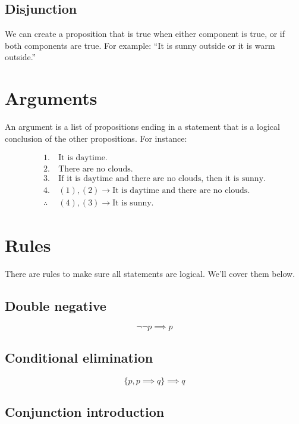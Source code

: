 \documentclass[a4paper,10pt]{report}
\begin{document}
\subsection{Disjunction}

We can create a proposition that is true when either component is true, or if
both components are true. For example: ``It is sunny outside or it is warm
outside.''

\section{Arguments}

An argument is a list of propositions ending in a statement that is a logical
conclusion of the other propositions. For instance:

\begin{align*}
 1.~&\text{It is daytime.} \\
 2.~&\text{There are no clouds.} \\
 3.~&\text{If it is daytime and there are no clouds, then it is sunny.} \\
 \hline
 4.~&(1), (2) \to \text{It is daytime and there are no clouds.} \\
 \hline
 \therefore~&(4), (3) \to \text{It is sunny.}
\end{align*}

\section{Rules}

There are rules to make sure all statements are logical. We'll cover them below.

\subsection{Double negative}
\begin{equation*}
 \lnot\lnot p \implies p
\end{equation*}

\subsection{Conditional elimination}
\begin{equation*}
 \{p, p \implies q\} \implies q
\end{equation*}

\subsection{Conjunction introduction}
\end{document}
